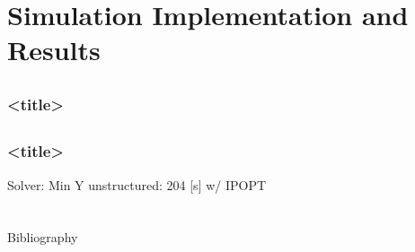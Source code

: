\documentclass[aspectratio=169]{beamer}
\begin{document}
\section{Simulation Implementation and Results}
\subsection{}
\begin{frame}
	\frametitle{<title>}

	

\end{frame}

\subsection{}
\begin{frame}
	\frametitle{<title>}

	Solver:
	Min Y unstructured: 204 [s] w/ IPOPT

\end{frame}





\section*{}




\begin{frame}[allowframebreaks]{Bibliography}
	
	
\end{frame}
\end{document}

